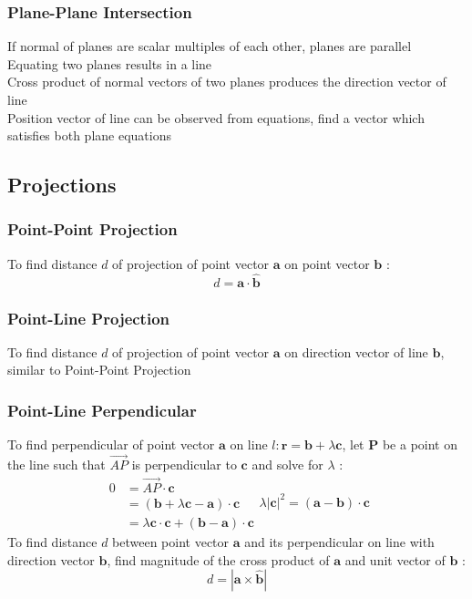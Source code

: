 \documentclass[../main]{subfiles}
\begin{document}
	\subsubsection{Plane-Plane Intersection}
	If normal of planes are scalar multiples of each other, planes are parallel \\
	Equating two planes results in a line \\ 
	Cross product of normal vectors of two planes produces the direction vector of line \\ 
	Position vector of line can be observed from equations, find a vector which satisfies both plane equations \\ 

\subsection{Projections}

	\subsubsection{Point-Point Projection}
	To find distance \(d\) of projection of point vector \(\mathbf{a}\) on point vector \(\mathbf{b}\) :
	\[ d = \mathbf{a} \cdot \mathbf{\hat{b}} \]
	\subsubsection{Point-Line Projection}
	To find distance \(d\) of projection of point vector \(\mathbf{a}\) on direction vector of line \(\mathbf{b}\), similar to Point-Point Projection
	\subsubsection{Point-Line Perpendicular}
	To find perpendicular of point vector \(\mathbf{a}\) on line \(l: \mathbf{r} = \mathbf{b} + \lambda \mathbf{c}\), let \(\mathbf{P}\) be a point on the line such that \(\overrightarrow{AP}\) is perpendicular to \(\mathbf{c}\) and solve for \(\lambda\) : 
	\begin{equation*}
		\begin{split}
		0 & = \overrightarrow{AP} \cdot \mathbf{c} \\
		  & = (\mathbf{b} + \lambda \mathbf{c} - \mathbf{a} ) \cdot \mathbf{c} \\
		  & = \lambda \mathbf{c} \cdot \mathbf{c} + (\mathbf{b} - \mathbf{a}) \cdot \mathbf{c}
		\end{split}
		\lambda | \mathbf{c} |^2 = (\mathbf{a} - \mathbf{b}) \cdot \mathbf{c}
	\end{equation*}
	To find distance \(d\) between point vector \(\mathbf{a}\) and its perpendicular on line with direction vector \(\mathbf{b}\), find magnitude of the cross product of \(\mathbf{a}\) and unit vector of \(\mathbf{b}\) :
	\[ d = |\mathbf{a} \times \mathbf{\hat{b}}| \]
\end{document}
